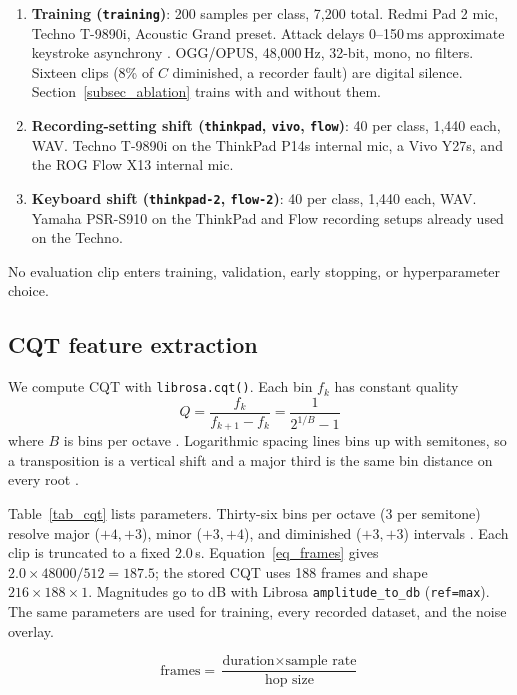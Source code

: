 \documentclass[pdflatex,sn-mathphys-num,iicol]{sn-jnl}
\begin{document}
\begin{enumerate}[1.]
\item \textbf{Training (\texttt{training})}: 200 samples per class, 7{,}200 total. Redmi Pad 2 mic, Techno T-9890i, Acoustic Grand preset. Attack delays 0--150\,ms approximate keystroke asynchrony \cite{Bella2011}. OGG/OPUS, 48{,}000\,Hz, 32-bit, mono, no filters. Sixteen clips (8\% of $C$ diminished, a recorder fault) are digital silence. Section~\ref{subsec_ablation} trains with and without them.
\item \textbf{Recording-setting shift (\texttt{thinkpad}, \texttt{vivo}, \texttt{flow})}: 40 per class, 1{,}440 each, WAV. Techno T-9890i on the ThinkPad P14s internal mic, a Vivo Y27s, and the ROG Flow X13 internal mic.
\item \textbf{Keyboard shift (\texttt{thinkpad-2}, \texttt{flow-2})}: 40 per class, 1{,}440 each, WAV. Yamaha PSR-S910 on the ThinkPad and Flow recording setups already used on the Techno.
\end{enumerate}

No evaluation clip enters training, validation, early stopping, or hyperparameter choice.

\subsection{CQT feature extraction}\label{subsec_cqt}

We compute CQT with \texttt{librosa.cqt()}. Each bin $f_k$ has constant quality
\begin{equation}
Q = \frac{f_k}{f_{k+1} - f_k} = \frac{1}{2^{1/B} - 1}
\label{eq_cqt}
\end{equation}
where $B$ is bins per octave \cite{Li2021,Lacoste2007}. Logarithmic spacing lines bins up with semitones, so a transposition is a vertical shift and a major third is the same bin distance on every root \cite{Harte2010}.

Table~\ref{tab_cqt} lists parameters. Thirty-six bins per octave (3 per semitone) resolve major ($+4,+3$), minor ($+3,+4$), and diminished ($+3,+3$) intervals \cite{Akram2025,OHanlon2021}. Each clip is truncated to a fixed 2.0\,s. Equation~\ref{eq_frames} gives $2.0\times 48000/512=187.5$; the stored CQT uses 188 frames and shape $216 \times 188 \times 1$. Magnitudes go to dB with Librosa \texttt{amplitude\_to\_db} (\texttt{ref=max}). The same parameters are used for training, every recorded dataset, and the noise overlay.

\begin{equation}
\text{frames} = \frac{\text{duration} \times \text{sample rate}}{\text{hop size}}
\label{eq_frames}
\end{equation}
\end{document}
